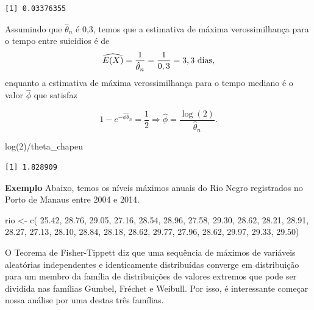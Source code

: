 \documentclass[
  letterpaper,
  DIV=11,
  numbers=noendperiod]{scrartcl}
\newenvironment{Shaded}{\begin{snugshade}}{\end{snugshade}}
\newcommand{\DecValTok}[1]{\textcolor[rgb]{0.68,0.00,0.00}{#1}}
\newcommand{\FloatTok}[1]{\textcolor[rgb]{0.68,0.00,0.00}{#1}}
\newcommand{\FunctionTok}[1]{\textcolor[rgb]{0.28,0.35,0.67}{#1}}
\newcommand{\NormalTok}[1]{\textcolor[rgb]{0.00,0.23,0.31}{#1}}
\newcommand{\OtherTok}[1]{\textcolor[rgb]{0.00,0.23,0.31}{#1}}
\newcommand{\SpecialCharTok}[1]{\textcolor[rgb]{0.37,0.37,0.37}{#1}}
\begin{document}
\begin{verbatim}
[1] 0.03376355
\end{verbatim}

Assumindo que \(\hat{\theta}_n\) é 0,3, temos que a estimativa de máxima
verossimilhança para o tempo entre suicídios é de
\[\widehat{E(X)}=\frac{1}{\hat{\theta}_n}=\frac{1}{0,3}=3,3\hbox { dias},\]
enquanto a estimativa de máxima verossimilhança para o tempo mediano é o
valor \(\hat{\phi}\) que satisfaz

\[1-e^{-\hat{\phi}\hat{\theta}_n}=\frac{1}{2}\Rightarrow \hat{\phi}=\frac{\log(2)}{\hat{\theta}_n}.\]

\begin{Shaded}
\begin{Highlighting}[]
\FunctionTok{log}\NormalTok{(}\DecValTok{2}\NormalTok{)}\SpecialCharTok{/}\NormalTok{theta\_chapeu}
\end{Highlighting}
\end{Shaded}

\begin{verbatim}
[1] 1.828909
\end{verbatim}

\textbf{Exemplo} Abaixo, temos os níveis máximos anuais do Rio Negro
registrados no Porto de Manaus entre 2004 e 2014.

\begin{Shaded}
\begin{Highlighting}[]
\NormalTok{rio }\OtherTok{\textless{}{-}} \FunctionTok{c}\NormalTok{(}
\FloatTok{25.42}\NormalTok{, }\FloatTok{28.76}\NormalTok{, }\FloatTok{29.05}\NormalTok{, }\FloatTok{27.16}\NormalTok{, }\FloatTok{28.54}\NormalTok{, }\FloatTok{28.96}\NormalTok{, }\FloatTok{27.58}\NormalTok{, }\FloatTok{29.30}\NormalTok{, }\FloatTok{28.62}\NormalTok{, }\FloatTok{28.21}\NormalTok{, }\FloatTok{28.91}\NormalTok{, }\FloatTok{28.27}\NormalTok{, }\FloatTok{27.13}\NormalTok{, }\FloatTok{28.10}\NormalTok{, }\FloatTok{28.84}\NormalTok{, }\FloatTok{28.18}\NormalTok{, }\FloatTok{28.62}\NormalTok{, }\FloatTok{29.77}\NormalTok{, }\FloatTok{27.96}\NormalTok{, }\FloatTok{28.62}\NormalTok{, }\FloatTok{29.97}\NormalTok{, }\FloatTok{29.33}\NormalTok{, }\FloatTok{29.50}\NormalTok{)}
\end{Highlighting}
\end{Shaded}

O Teorema de Fisher-Tippett diz que uma sequência de máximos de
variáveis aleatórias independentes e identicamente distribuídas converge
em distribuição para um membro da família de distribuições de valores
extremos que pode ser dividida nas famílias Gumbel, Fréchet e Weibull.
Por isso, é interessante começar nossa análise por uma destas três
famílias.
\end{document}
